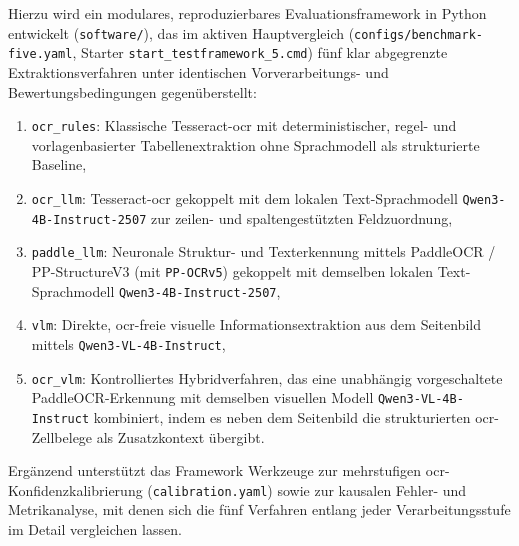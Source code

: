 Hierzu wird ein modulares, reproduzierbares Evaluationsframework in Python entwickelt (\texttt{software/}), das im aktiven Hauptvergleich (\texttt{configs/benchmark-five.yaml}, Starter \texttt{start\_testframework\_5.cmd}) fünf klar abgegrenzte Extraktionsverfahren unter identischen Vorverarbeitungs- und Bewertungsbedingungen gegenüberstellt:
\begin{enumerate}
  \item \texttt{ocr\_rules}: Klassische Tesseract-\ac{ocr} mit deterministischer, regel- und vorlagenbasierter Tabellenextraktion ohne Sprachmodell als strukturierte Baseline,
  \item \texttt{ocr\_llm}: Tesseract-\ac{ocr} gekoppelt mit dem lokalen Text-Sprachmodell \texttt{Qwen3-4B-Instruct-2507} zur zeilen- und spaltengestützten Feldzuordnung,
  \item \texttt{paddle\_llm}: Neuronale Struktur- und Texterkennung mittels PaddleOCR / PP-StructureV3 (mit \texttt{PP-OCRv5}) gekoppelt mit demselben lokalen Text-Sprachmodell \texttt{Qwen3-4B-Instruct-2507},
  \item \texttt{vlm}: Direkte, \ac{ocr}-freie visuelle Informationsextraktion aus dem Seitenbild mittels \texttt{Qwen3-VL-4B-Instruct},
  \item \texttt{ocr\_vlm}: Kontrolliertes Hybridverfahren, das eine unabhängig vorgeschaltete PaddleOCR-Erkennung mit demselben visuellen Modell \texttt{Qwen3-VL-4B-Instruct} kombiniert, indem es neben dem Seitenbild die strukturierten \ac{ocr}-Zellbelege als Zusatzkontext übergibt.
\end{enumerate}
Ergänzend unterstützt das Framework Werkzeuge zur mehrstufigen \ac{ocr}-Konfidenzkalibrierung (\texttt{calibration.yaml}) sowie zur kausalen Fehler- und Metrikanalyse, mit denen sich die fünf Verfahren entlang jeder Verarbeitungsstufe im Detail vergleichen lassen.

